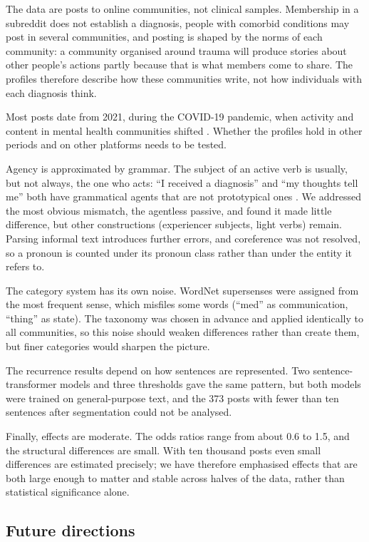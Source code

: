 \documentclass[11pt,a4paper]{article}
\begin{document}
The data are posts to online communities, not clinical samples. Membership in a subreddit does not establish a diagnosis, people with comorbid conditions may post in several communities, and posting is shaped by the norms of each community: a community organised around trauma will produce stories about other people's actions partly because that is what members come to share. The profiles therefore describe how these communities write, not how individuals with each diagnosis think.

Most posts date from 2021, during the COVID-19 pandemic, when activity and content in mental health communities shifted \citep{low2020}. Whether the profiles hold in other periods and on other platforms needs to be tested.

Agency is approximated by grammar. The subject of an active verb is usually, but not always, the one who acts: ``I received a diagnosis'' and ``my thoughts tell me'' both have grammatical agents that are not prototypical ones \citep{dowty1991}. We addressed the most obvious mismatch, the agentless passive, and found it made little difference, but other constructions (experiencer subjects, light verbs) remain. Parsing informal text introduces further errors, and coreference was not resolved, so a pronoun is counted under its pronoun class rather than under the entity it refers to.

The category system has its own noise. WordNet supersenses were assigned from the most frequent sense, which misfiles some words (``med'' as communication, ``thing'' as state). The taxonomy was chosen in advance and applied identically to all communities, so this noise should weaken differences rather than create them, but finer categories would sharpen the picture.

The recurrence results depend on how sentences are represented. Two sentence-transformer models and three thresholds gave the same pattern, but both models were trained on general-purpose text, and the 373 posts with fewer than ten sentences after segmentation could not be analysed.

Finally, effects are moderate. The odds ratios range from about 0.6 to 1.5, and the structural differences are small. With ten thousand posts even small differences are estimated precisely; we have therefore emphasised effects that are both large enough to matter and stable across halves of the data, rather than statistical significance alone.

\subsection{Future directions}
\end{document}
